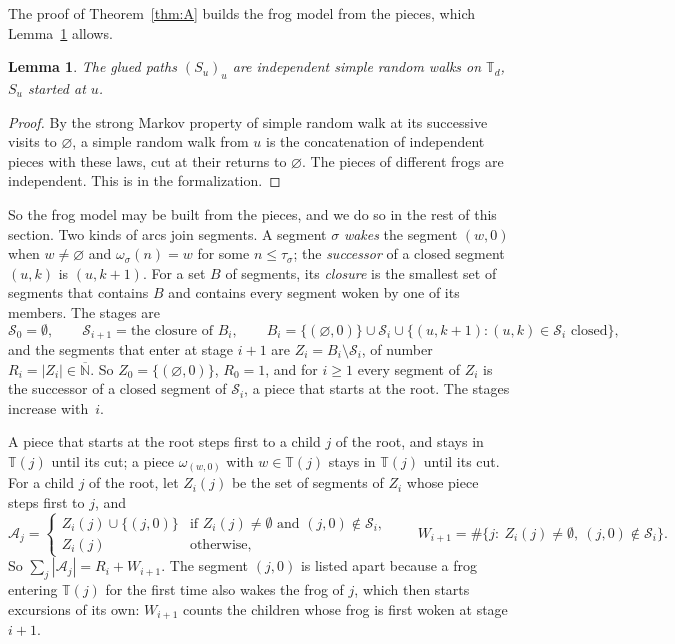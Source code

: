\documentclass[11pt]{amsart}
\newtheorem{lemma}[theorem]{Lemma}
\theoremstyle{definition}
\numberwithin{equation}{section}
\newcommand{\lean}[1]{\ignorespaces}
\newcommand{\T}{\mathbb{T}}
\newcommand{\Nb}{\overline{\mathbb{N}}}
\newcommand{\cS}{\mathcal{S}}
\newcommand{\cA}{\mathcal{A}}
\begin{document}
The proof of Theorem~\ref{thm:A} builds the frog model from the pieces, which Lemma~\ref{lem:glue} allows.

\begin{lemma}\label{lem:glue}\lean{FrogModel.map_glue, FrogModel.lintegral_visits_eq}
The glued paths $(S_u)_u$ are independent simple random walks on $\T_d$, $S_u$ started at $u$.
\end{lemma}

\begin{proof}
By the strong Markov property of simple random walk at its successive visits to $\varnothing$, a simple random walk from $u$ is the concatenation of independent pieces with these laws, cut at their returns to $\varnothing$. The pieces of different frogs are independent. This is  in the formalization.
\end{proof}

So the frog model may be built from the pieces, and we do so in the rest of this section. Two kinds of arcs join segments. A segment $\sigma$ \emph{wakes} the segment $(w,0)$ when $w\neq\varnothing$ and $\omega_\sigma(n)=w$ for some $n\le\tau_\sigma$; the \emph{successor} of a closed segment $(u,k)$ is $(u,k+1)$. For a set $B$ of segments, its \emph{closure} is the smallest set of segments that contains $B$ and contains every segment woken by one of its members. The stages are
\[
\cS_0=\emptyset,\qquad \cS_{i+1}=\text{the closure of } B_i,\qquad B_i=\{(\varnothing,0)\}\cup\cS_i\cup\{(u,k+1):(u,k)\in\cS_i \text{ closed}\},
\]
and the segments that enter at stage $i+1$ are $Z_i=B_i\setminus\cS_i$, of number $R_i=|Z_i|\in\Nb$. So $Z_0=\{(\varnothing,0)\}$, $R_0=1$, and for $i\ge1$ every segment of $Z_i$ is the successor of a closed segment of $\cS_i$, a piece that starts at the root. The stages increase with~$i$.

A piece that starts at the root steps first to a child $j$ of the root, and stays in $\T(j)$ until its cut; a piece $\omega_{(w,0)}$ with $w\in\T(j)$ stays in $\T(j)$ until its cut. For a child $j$ of the root, let $Z_i(j)$ be the set of segments of $Z_i$ whose piece steps first to $j$, and
\[
\cA_j=\begin{cases}Z_i(j)\cup\{(j,0)\} & \text{if } Z_i(j)\neq\emptyset \text{ and } (j,0)\notin\cS_i,\\ Z_i(j) & \text{otherwise},\end{cases}
\qquad W_{i+1}=\#\{j:\ Z_i(j)\neq\emptyset,\ (j,0)\notin\cS_i\}.
\]
So $\sum_j|\cA_j|=R_i+W_{i+1}$. The segment $(j,0)$ is listed apart because a frog entering $\T(j)$ for the first time also wakes the frog of $j$, which then starts excursions of its own: $W_{i+1}$ counts the children whose frog is first woken at stage $i+1$.
\end{document}
